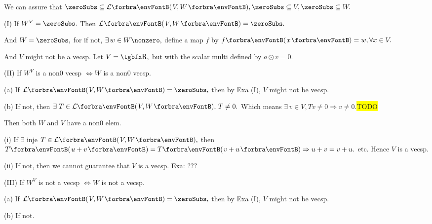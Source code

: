 We can assure that $\zeroSubs\subseteq\Lm{V,W},\zeroSubs\subseteq V,\zeroSubs\subseteq W.$\par\quad
(I) If $W^V=\zeroSubs.$ Then $\Lm{V,W}=\zeroSubs.$\par\quad\HI
And $W=\zeroSubs,$ for if not, $\exists\,w\in W\nonzero,$ define a map $f$ by $f\Par{x}=w,\forall x\in V.$\par\quad\HI
And $V$ might not be a vecsp. \AExa Let $V=\Rbb,$ but with the scalar multi defined by $a\odot v=0.$\par\quad\EndI
(II) If $W^V$ is a non0 vecsp $\Longleftrightarrow W$ is a non0 vecsp.\par\quad\HII
(a) If $\Lm{V,W}=\zeroSubs,$ then by Exa (I), $V$ might not be vecsp.\par\quad\HII
(b) If not, then $\exists\;T\in\Lm{V,W},\,T\neq 0.$ Which means $\exists\,v\in V,Tv\neq 0\Rightarrow v\neq 0.$\colorbox{yellow}{TODO}\par\quad\HII\Hb
Then both $W$ and $V$ have a non0 elem.\par\quad\HII\Hb
(i) If $\exists$ inje $T\in\Lm{V,W},$ then $T\Par{u+v}=T\Par{v+u}\Rightarrow u+v=v+u.$ etc. Hence $V$ is a vecsp.\par\quad\HII\Ha\Endi
(ii) If not, then we cannot guarantee that $V$ is a vecsp. Exa: ???\par\quad\EndII
(III) If $W^V$ is not a vecsp $\Longleftrightarrow W$ is not a vecsp.\par\quad\HIII
(a) If $\Lm{V,W}=\zeroSubs,$ then by Exa (I), $V$ might not be vecsp.\par\quad\HIII
(b) If not.\PfEnd
\SepLine
\ChEnd\pagebreak



\vspace{4pt}

%

